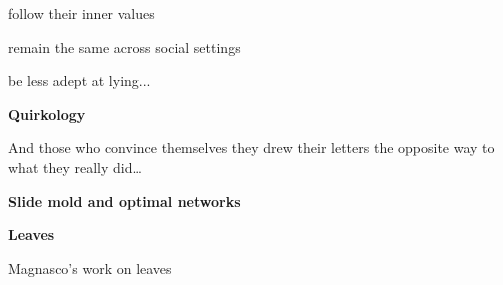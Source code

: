       follow their inner values
    
      remain the same across social settings
    
      be less adept at lying...
    
  



  \textbf{Quirkology}

  
  
    And those who convince themselves
    they drew their letters the opposite way
    to what they really did\ldots

    \bigskip

    {}
  



  \textbf{Slide mold and optimal networks}


  \textbf{Leaves}

  Magnasco's work on leaves


  








